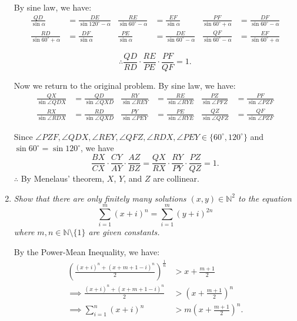 \documentclass{article}
\begin{document}
\begin{enumerate}
By sine law, we have:
\begin{align*}
\frac{QD}{\sin{\alpha}} &= \frac{DE}{\sin{120^\circ - \alpha}} & \frac{RE}{\sin{60^\circ - \alpha}} &= \frac{EF}{\sin{\alpha}} & \frac{PF}{\sin{60^\circ + \alpha}} &= \frac{DF}{\sin{60^\circ - \alpha}}\\
\frac{RD}{\sin{60^\circ + \alpha}} &= \frac{DF}{\sin{\alpha}} & \frac{PE}{\sin{\alpha}} &= \frac{DE}{\sin{60^\circ - \alpha}} & \frac{QF}{\sin{60^\circ - \alpha}} &= \frac{EF}{\sin{60^\circ + \alpha}}
\end{align*}

$$\therefore \frac{QD}{RD} \cdot \frac{RE}{PE} \cdot \frac{PF}{QF} = 1.$$

Now we return to the original problem. By sine law, we have:
\begin{align*}
	\frac{QX}{\sin{\angle QDX}} &= \frac{QD}{\sin{\angle QXD}} & \frac{RY}{\sin{\angle REY}} &= \frac{RE}{\sin{\angle RYE}} & \frac{PZ}{\sin{\angle PFZ}} &= \frac{PF}{\sin{\angle PZF}}\\
	\frac{RX}{\sin{\angle RDX}} &= \frac{RD}{\sin{\angle QXD}} & \frac{PY}{\sin{\angle PEY}} &= \frac{PE}{\sin{\angle RYE}} & \frac{QZ}{\sin{\angle QFZ}} &= \frac{QF}{\sin{\angle PZF}}
\end{align*}

Since $\angle PZF, \angle QDX, \angle REY, \angle QFZ, \angle RDX, \angle PEY \in \{60^\circ, 120^\circ\}$ and $\sin{60^\circ} = \sin{120^\circ}$, we have
\[ \frac{BX}{CX} \cdot \frac{CY}{AY} \cdot \frac{AZ}{BZ} = \frac{QX}{RX} \cdot \frac{RY}{PY} \cdot \frac{PZ}{QZ} = 1. \]
$\therefore$ By Menelaus' theorem, $X$, $Y$, and $Z$ are collinear.



\medskip
\item %
{\itshape Show that there are only finitely many solutions $(x, y) \in \mathbb{N}^2$ to the equation
$$\sum_{i = 1}^{m} (x + i)^n = \sum_{i = 1}^{m} (y + i)^{2n}$$
where $m, n \in \mathbb{N} \setminus \{1\}$ are given constants.}

By the Power-Mean Inequality, we have:
\begin{align*}
	\left(\frac{(x + i)^n + (x + m + 1 - i)^n}{2}\right)^{\frac{1}{n}} &> x + \frac{m + 1}{2} \\
	\implies \frac{(x + i)^n + (x + m + 1 - i)^n}{2} &> \left(x + \frac{m + 1}{2}\right)^n \\
	\implies \sum_{i = 1}^{n} (x + i)^n &> m\left(x + \frac{m + 1}{2}\right)^n.
\end{align*}


\end{enumerate}
\end{document}
